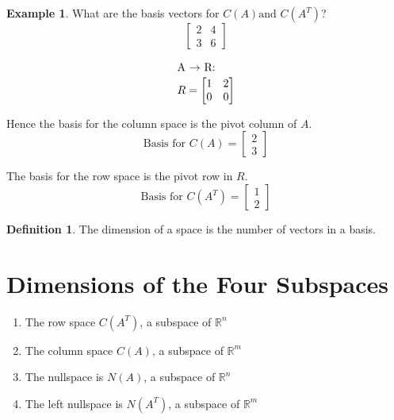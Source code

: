\documentclass[12pt, letterpaper]{article}
\newcommand{\R}[1]{$\mathbb{R}^{#1}$}
\newcommand{\DefinitionSpace}{\vspace{15px}}
\theoremstyle{definition}
\newtheorem{definition}{Definition}[section]
\newtheorem{example}{Example}
\begin{document}
		\begin{example}
			What are the basis vectors for $C(A) \text{and } C(A^T)$?
				$$\begin{bmatrix} 2 & 4 \\ 3 & 6 \end{bmatrix}$$
				
				\begin{gather*}
					\intertext{A $\rightarrow$ R:}
						R = \begin{bmatrix} 1 & 2 \\ 0 & 0 \end{bmatrix}
				\end{gather*}
			
			\noindent Hence the basis for the column space is the pivot column of $A$.
				\begin{equation*}
					\text{Basis for } C(A) = \begin{bmatrix} 2 \\ 3 \end{bmatrix}
				\end{equation*}
				
			\noindent The basis for the row space is the pivot row in $R$.
				\begin{equation*}
					\text{Basis for } C(A^T) = \begin{bmatrix} 1 \\ 2 \end{bmatrix}
				\end{equation*}
		\end{example}
	
	\DefinitionSpace
		\begin{definition}
			The dimension of a space is the number of vectors in a basis.
		\end{definition}
	\DefinitionSpace
	
	
	
\section{Dimensions of the Four Subspaces}
	\begin{enumerate}
		\item The row space $C(A^T)$, a subspace of \R{n}
		\item The column space $C(A)$, a subspace of \R{m}
		\item The nullspace is $N(A)$, a subspace of \R{n}
		\item The left nullspace is $N(A^T)$, a subspace of \R{m}
	\end{enumerate}
\end{document}
